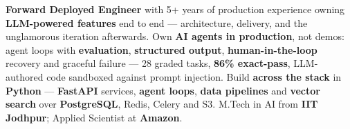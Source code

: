 \documentclass[letter,10pt]{article}
\begin{document}

\textbf{Forward Deployed Engineer} with 5+ years of production experience owning \textbf{LLM-powered features} end to end --- architecture, delivery, and the unglamorous iteration afterwards.
Own \textbf{AI agents in production}, not demos: agent loops with \textbf{evaluation}, \textbf{structured output}, \textbf{human-in-the-loop} recovery and graceful failure --- 28 graded tasks, \textbf{86\% exact-pass}, LLM-authored code sandboxed against prompt injection.
Build \textbf{across the stack} in \textbf{Python} --- \textbf{FastAPI} services, \textbf{agent loops}, \textbf{data pipelines} and \textbf{vector search} over \textbf{PostgreSQL}, Redis, Celery and S3.
M.Tech in AI from \textbf{IIT Jodhpur}; Applied Scientist at \textbf{Amazon}.
\end{document}
